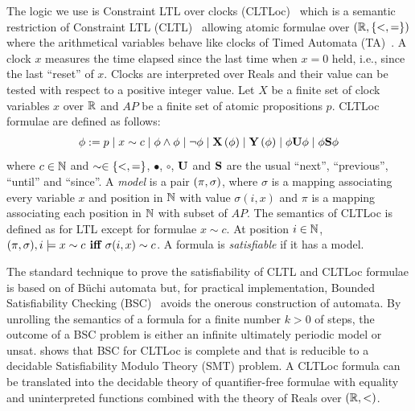 The logic we use is Constraint LTL over clocks (CLTLoc)~\cite{BRS15} which is a semantic restriction of Constraint LTL (CLTL)~\cite{DD07} allowing atomic formulae over $(\mathbb{R}, \{ <,= \})$ where the arithmetical variables behave like clocks of Timed Automata (TA)~\cite{timed}.
A clock $x$ measures the time elapsed since the last time when $x=0$ held, i.e., since the last ``reset'' of $x$.
Clocks are interpreted over Reals and their value can be tested with respect to a positive integer value.
%
Let $X$ be a finite set of clock variables $x$ over $\mathbb{R}$ and $AP$ be a finite set of atomic propositions $p$.
CLTLoc formulae are defined as follows:
\begin{equation*}%
  \phi :=
  \begin{gathered}
    p \mid x\sim c \mid \phi \wedge \phi \mid \neg \phi \mid
   \X{\phi} \mid \Y{\phi} %
\mid \phi\U\phi \mid \phi\Snc\phi
  \end{gathered}
\end{equation*}
where %
$c \in \mathbb{N}$ and $\sim \in \{ <,= \}$, $\bullet$, $\circ$, $\mathbf{U}$ and $\mathbf{S}$ are the usual ``next'', ``previous'', ``until'' and ``since''.
A \textit{model} is a pair $(\pi, \sigma)$, where $\sigma$ is a mapping associating every variable $x$ and position in $\mathbb{N}$ with value $\sigma(i,x)$ and $\pi$ is a mapping associating each position in $\mathbb{N}$ with subset of $AP$. 
The semantics of CLTLoc is defined as for LTL except for formulae $x\sim c$. 
At position $i\in\mathbb{N}$, $ (\pi, \sigma), i \models x\sim c \textbf{ iff }  \sigma(i, x)\sim c$.
A formula is \textit{satisfiable} if it has a model.

The standard technique to prove the satisfiability of CLTL and CLTLoc formulae is based on of B\"uchi automata \cite{DD07,BRS15} %
but, for practical implementation, Bounded Satisfiability Checking (BSC)~\cite{MPS13} avoids the onerous construction of automata.
By unrolling the semantics of a formula for a finite number $k>0$ of steps, 
the outcome of a BSC problem is either an infinite ultimately periodic model or unsat.
\cite{BRS15} shows that BSC for CLTLoc is complete and that is reducible to a decidable Satisfiability Modulo Theory (SMT) problem. 
A CLTLoc formula can be translated into the decidable theory of quantifier-free formulae with equality and uninterpreted functions combined with the theory of Reals over $(\mathbb{R},<)$. %

